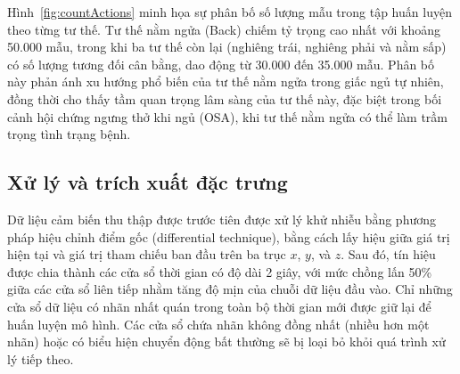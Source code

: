Hình~\ref{fig:countActions} minh họa sự phân bố số lượng mẫu trong 
tập huấn luyện theo từng tư thế. Tư thế nằm ngửa (Back) chiếm tỷ 
trọng cao nhất với khoảng 50.000 mẫu, trong khi ba tư thế còn lại 
(nghiêng trái, nghiêng phải và nằm sấp) có số lượng tương đối cân bằng, 
dao động từ 30.000 đến 35.000 mẫu. Phân bố này phản ánh xu hướng phổ 
biến của tư thế nằm ngửa trong giấc ngủ tự nhiên, đồng thời cho thấy 
tầm quan trọng lâm sàng của tư thế này, đặc biệt trong bối cảnh hội 
chứng ngưng thở khi ngủ (OSA), khi tư thế nằm ngửa có thể làm trầm 
trọng tình trạng bệnh.



\subsection{Xử lý và trích xuất đặc trưng}

Dữ liệu cảm biến thu thập được trước tiên được xử lý khử nhiễu bằng 
phương pháp hiệu chỉnh điểm gốc (differential technique), bằng cách 
lấy hiệu giữa giá trị hiện tại và giá trị tham chiếu ban đầu trên ba 
trục $x$, $y$, và $z$. Sau đó, tín hiệu được chia thành các cửa sổ 
thời gian có độ dài 2 giây, với mức chồng lấn 50\% giữa các cửa sổ 
liên tiếp nhằm tăng độ mịn của chuỗi dữ liệu đầu vào.
Chỉ những cửa sổ dữ liệu có nhãn nhất quán trong toàn bộ thời gian 
mới được giữ lại để huấn luyện mô hình. Các cửa sổ chứa nhãn không 
đồng nhất (nhiều hơn một nhãn) hoặc có biểu hiện chuyển động bất 
thường sẽ bị loại bỏ khỏi quá trình xử lý tiếp theo.

